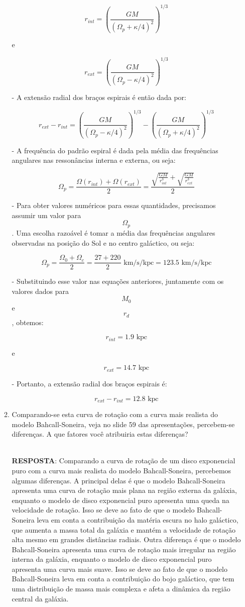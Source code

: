 \documentclass[a4paper,12pt]{article}
\begin{document}
\begin{enumerate}
\begin{enumerate}
$$r_{int} = \left(\frac{GM}{(\Omega_p + \kappa/4)^2}\right)^{1/3}$$

e

$$r_{ext} = \left(\frac{GM}{(\Omega_p - \kappa/4)^2}\right)^{1/3}$$

- A extensão radial dos braços espirais é então dada por:

$$r_{ext} - r_{int} = \left(\frac{GM}{(\Omega_p - \kappa/4)^2}\right)^{1/3} - \left(\frac{GM}{(\Omega_p + \kappa/4)^2}\right)^{1/3}$$

- A frequência do padrão espiral é dada pela média das frequências angulares nas ressonâncias interna e externa, ou seja:

$$\Omega_p = \frac{\Omega(r_{int}) + \Omega(r_{ext})}{2} = \frac{\sqrt{\frac{GM}{r_{int}^3}} + \sqrt{\frac{GM}{r_{ext}^3}}}{2}$$

- Para obter valores numéricos para essas quantidades, precisamos assumir um valor para $$\Omega_p$$. Uma escolha razoável é tomar a média das frequências angulares observadas na posição do Sol e no centro galáctico, ou seja:

$$\Omega_p = \frac{\Omega_0 + \Omega_c}{2} = \frac{27 + 220}{2} \text{ km/s/kpc} = 123.5 \text{ km/s/kpc}$$

- Substituindo esse valor nas equações anteriores, juntamente com os valores dados para $$M_0$$ e $$r_d$$, obtemos:

$$r_{int} = 1.9 \text{ kpc}$$

e

$$r_{ext} = 14.7 \text{ kpc}$$

- Portanto, a extensão radial dos braços espirais é:

$$r_{ext} - r_{int} = 12.8 \text{ kpc}$$

\noindent\hrulefill

\item Comparando-se esta curva de rotação com a curva mais realista do 
modelo Bahcall-Soneira, veja no slide 59 das apresentações, percebem-se
diferenças. A que fatores você atribuiria estas diferenças?

\noindent\hrulefill\\\textbf{RESPOSTA}: Comparando a curva de rotação de um disco exponencial puro com a curva mais realista do modelo Bahcall-Soneira, percebemos algumas diferenças. A principal delas é que o modelo Bahcall-Soneira apresenta uma curva de rotação mais plana na região externa da galáxia, enquanto o modelo de disco exponencial puro apresenta uma queda na velocidade de rotação. Isso se deve ao fato de que o modelo Bahcall-Soneira leva em conta a contribuição da matéria escura no halo galáctico, que aumenta a massa total da galáxia e mantém a velocidade de rotação alta mesmo em grandes distâncias radiais. Outra diferença é que o modelo Bahcall-Soneira apresenta uma curva de rotação mais irregular na região interna da galáxia, enquanto o modelo de disco exponencial puro apresenta uma curva mais suave. Isso se deve ao fato de que o modelo Bahcall-Soneira leva em conta a contribuição do bojo galáctico, que tem uma distribuição de massa mais complexa e afeta a dinâmica da região central da galáxia.


\end{enumerate}
\end{enumerate}
\end{document}
